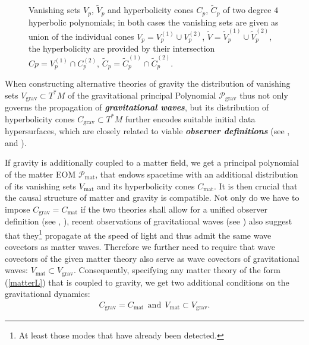 \documentclass[%
preprint,
titlepage,
nofootinbib,
amsmath,amssymb,
showkeys,
aps,
prd,
floatfix,
]{revtex4-2}
\newcommand{\coneback}[4][]{
  \draw[canvas is xy plane at z=#2, #1] (45-#4:#3) arc (45-#4:225+#4:#3) -- (O) --cycle;
  }
\newcommand{\conefront}[4][]{
  \draw[canvas is xy plane at z=#2, #1] (45-#4:#3) arc (45-#4:-135+#4:#3) -- (O) --cycle;
  }
\begin{document}
\begin{figure}
\begin{minipage}{0.45\textwidth}
\begin{center}
\end{center}
\end{minipage}
    \caption{Vanishing sets $V_p$, $\widetilde{V}_p$ and hyperbolicity cones $C_p$, $\widetilde{C}_p$ of two degree $4$ hyperbolic polynomials; in both cases the vanishing sets are given as union of the individual cones $V_p = V_p^{(1)} \cup V_p^{(2)}$, $\widetilde{V} = \widetilde{V}_p^{(1)} \cup \widetilde{V}_p^{(2)}$, the hyperbolicity are provided by their intersection $Cp = V_p^{(1)} \cap C_p^{(2)}$,  $\widetilde{C}_p = \widetilde{C}_p^{(1)} \cap \widetilde{C}_p^{(2)}$.}
    \label{Poly}
\end{figure}

When constructing alternative theories of gravity the distribution of vanishing sets $V_{\text{grav}} \subset T^{\ast}M$ of the gravitational principal Polynomial $\mathcal{P}_{\text{grav}}$ thus not only governs the propagation of \textit{\textbf{gravitational waves}}, but its  distribution of hyperbolicity cones $C_{\text{grav}}\subset T^{\ast}M$ further encodes suitable initial data hypersurfaces, which are closely related to viable \textit{\textbf{observer definitions}} (see \cite{2018PhRvD..97h4036D}, \cite{2011PhRvD..83d4047R} and \cite{Rivera}). 

If gravity is additionally coupled to a matter field, we get a principal polynomial of the matter EOM $\mathcal{P}_{\text{mat}}$, that endows spacetime with an additional distribution of its vanishing sets $V_{\text{mat}}$ and its hyperbolicity cones $C_{\text{mat}}$. It is then crucial that the causal structure of matter and gravity is compatible. 
Not only do we have to impose $C_{\text{grav}} = C_{\text{mat}}$ if the two theories shall allow for a unified observer definition (see \cite{Rivera}, \cite{2011PhRvD..83d4047R}), recent observations of gravitational waves (see \cite{2017ApJ...848L..13A}) also suggest that they\footnote{At least those modes that have already been detected.} propagate at the speed of light and thus admit the same wave covectors as matter waves.
Therefore we further need to require that wave covectors of the given matter theory also serve as wave covectors of gravitational waves: $V_{\text{mat}} \subset V_{\text{grav}}$.
Consequently, specifying any matter theory of the form (\ref{matterL}) that is coupled to gravity, we get two additional conditions on the gravitational dynamics:
\begin{align}\label{A2}
    C_{\text{grav}} = C_{\text{mat}} \ \ \text{and} \ \ V_{\text{mat}} \subset V_{\text{grav}}.\tag{Axiom 2}
\end{align}
\end{document}
